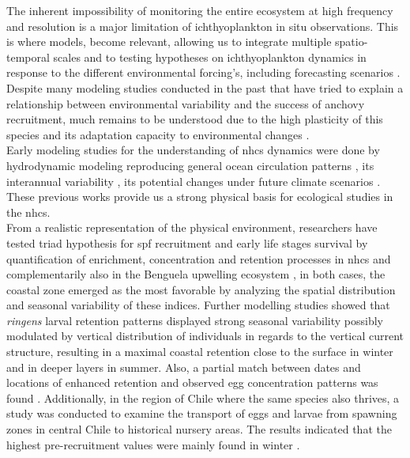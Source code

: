 The inherent impossibility of monitoring the entire ecosystem at high frequency and resolution is a major limitation of ichthyoplankton in situ observations. This is where models, become relevant, allowing us to integrate multiple spatio-temporal scales and to testing hypotheses on ichthyoplankton dynamics in response to the different  environmental forcing’s, including forecasting scenarios \citep{GearDode2020}.\\

Despite many modeling studies conducted in the past \citep{LettPenv2007,BrocLett2008,GutiRami2008,OlivPena2011,XuChai2013} that have tried to explain a relationship between environmental variability and the success of anchovy recruitment, much remains to be understood due to the high plasticity of this species and its adaptation capacity to environmental changes \citep{EspiBert2008,EspiBert2014,CanaAdas2018,PlazCern2018}.\\

Early modeling studies for the understanding of \acrshort{nhcs} dynamics were done by hydrodynamic modeling reproducing general ocean circulation patterns \citep{PenvEche2005,ColaMcwi2012}, its interannual variability \citep{ColaCape2008,EspiEche2017}, its potential changes under future climate scenarios \citep{OerdCola2015,EcheGeva2020}. These previous works provide us a strong physical basis for ecological studies in the \acrshort{nhcs}.\\

From a realistic representation of the physical environment, researchers have tested \cite{Baku1998} triad hypothesis for \acrshort{spf} recruitment and early life stages survival by quantification of enrichment, concentration and retention processes in \acrshort{nhcs} \citep{LettPenv2007} and complementarily also in the Benguela upwelling ecosystem \citep{LettRoy2006}, in both cases, the coastal zone emerged as the most favorable by analyzing the spatial distribution and seasonal variability of these indices. Further modelling studies showed that \textit{\gls{ringens}} larval retention patterns displayed strong seasonal variability possibly modulated by vertical distribution of individuals in regards to the vertical current structure, resulting in a maximal coastal retention close to the surface in winter and in deeper layers in summer. Also, a partial match between dates and locations of enhanced retention and observed egg concentration patterns was found \citep{BrocLett2008}. Additionally, in the region of Chile where the same species also thrives, a study was conducted to examine the transport of eggs and larvae from spawning zones in central Chile to historical nursery areas. The results indicated that the highest pre-recruitment values were mainly found in winter \citep{ParaCola2012}.\\


